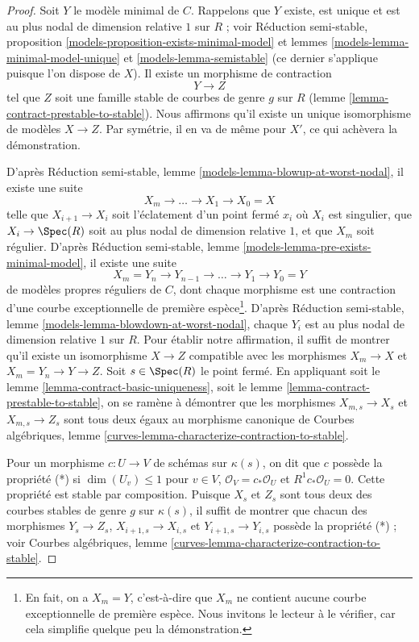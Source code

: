 \begin{proof}
Soit $Y$ le modèle minimal de $C$. Rappelons que $Y$ existe, est
unique et est au plus nodal de dimension relative $1$ sur $R$ ; voir
Réduction semi-stable,
proposition \ref{models-proposition-exists-minimal-model} et
lemmes \ref{models-lemma-minimal-model-unique} et
\ref{models-lemma-semistable} (ce dernier s'applique puisque l'on dispose de $X$).
Il existe un morphisme de contraction
$$
Y \longrightarrow Z
$$
tel que $Z$ soit une famille stable de courbes de genre $g$ sur $R$
(lemme \ref{lemma-contract-prestable-to-stable}). Nous affirmons
qu'il existe un unique isomorphisme de modèles $X \to Z$.
Par symétrie, il en va de même pour $X'$, ce qui achèvera la démonstration.

\medskip\noindent
D'après Réduction semi-stable, lemme \ref{models-lemma-blowup-at-worst-nodal},
il existe une suite
$$
X_m \to \ldots \to X_1 \to X_0 = X
$$
telle que $X_{i + 1} \to X_i$ soit l'éclatement d'un point fermé
$x_i$ où $X_i$ est singulier, que $X_i \to \Spec(R)$ soit au plus nodal
de dimension relative $1$, et que $X_m$ soit régulier.
D'après Réduction semi-stable, lemme \ref{models-lemma-pre-exists-minimal-model},
il existe une suite
$$
X_m = Y_n \to Y_{n - 1} \to \ldots \to Y_1 \to Y_0 = Y
$$
de modèles propres réguliers de $C$, dont chaque morphisme est une
contraction d'une courbe exceptionnelle de première espèce\footnote{En fait,
on a $X_m = Y$, c'est-à-dire que $X_m$ ne contient aucune courbe exceptionnelle
de première espèce. Nous invitons le lecteur à le vérifier,
car cela simplifie quelque peu la démonstration.}.
D'après Réduction semi-stable, lemme \ref{models-lemma-blowdown-at-worst-nodal},
chaque $Y_i$ est au plus nodal de dimension relative $1$ sur $R$.
Pour établir notre affirmation, il suffit de montrer qu'il existe un isomorphisme
$X \to Z$ compatible avec les morphismes $X_m \to X$
et $X_m = Y_n \to Y \to Z$. Soit $s \in \Spec(R)$ le point fermé.
En appliquant soit le
lemme \ref{lemma-contract-basic-uniqueness}, soit le
lemme \ref{lemma-contract-prestable-to-stable},
on se ramène à démontrer que les morphismes
$X_{m, s} \to X_s$ et
$X_{m, s} \to Z_s$
sont tous deux égaux au morphisme canonique de
Courbes algébriques, lemme \ref{curves-lemma-characterize-contraction-to-stable}.

\medskip\noindent
Pour un morphisme $c : U \to V$ de schémas sur $\kappa(s)$,
on dit que $c$ possède la propriété (*) si $\dim(U_v) \leq 1$ pour $v \in V$,
$\mathcal{O}_V = c_*\mathcal{O}_U$ et $R^1c_*\mathcal{O}_U = 0$.
Cette propriété est stable par composition.
Puisque $X_s$ et $Z_s$ sont tous deux des courbes stables de genre $g$ sur $\kappa(s)$,
il suffit de montrer que chacun des morphismes $Y_s \to Z_s$,
$X_{i + 1, s} \to X_{i, s}$ et $Y_{i + 1, s} \to Y_{i, s}$
possède la propriété (*) ; voir
Courbes algébriques, lemme \ref{curves-lemma-characterize-contraction-to-stable}.


\end{proof}
